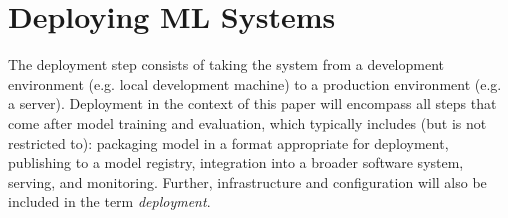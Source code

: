 \section{Deploying ML Systems}
\label{sec:deploying_ml_systems}
The deployment step consists of taking the system from a development environment (e.g. local development machine) to a production environment (e.g. a server).
Deployment in the context of this paper will encompass all steps that come after model training and evaluation, which typically includes (but is not restricted to): packaging model in a format appropriate for deployment, publishing to a model registry, integration into a broader software system, serving, and monitoring.
Further, infrastructure and configuration will also be included in the term \emph{deployment}.